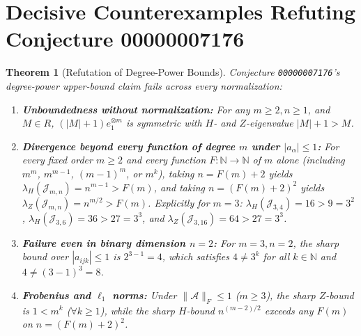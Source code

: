 \documentclass[11pt]{article}
\newtheorem{theorem}{Theorem}[section]
\theoremstyle{definition}
\newcommand{\N}{\mathbb{N}}
\newcommand{\cA}{\mathcal{A}}
\newcommand{\cJ}{\mathcal{J}}
\begin{document}
\section{Decisive Counterexamples Refuting Conjecture 00000007176}

\begin{theorem}[Refutation of Degree-Power Bounds]\label{thm:refute-deg}
Conjecture \texttt{00000007176}'s degree-power upper-bound claim fails across every
normalization:
\begin{enumerate}
  \item \textbf{Unboundedness without normalization:} For any $m \ge 2, n \ge 1$, and $M \in R$,
  $(|M| + 1) e_1^{\otimes m}$ is symmetric with $H$- and $Z$-eigenvalue $|M| + 1 > M$.
  \item \textbf{Divergence beyond every function of degree $m$ under $|a_\alpha| \le 1$:} For
  every fixed order $m \ge 2$ and \emph{every} function $F : \N \to \N$ of $m$ alone (including
  $m^m$, $m^{m-1}$, $(m-1)^m$, or $m^k$), taking $n = F(m) + 2$ yields $\lambda_H(\cJ_{m,n}) =
  n^{m-1} > F(m)$, and taking $n = (F(m) + 2)^2$ yields $\lambda_Z(\cJ_{m,n}) = n^{m/2} > F(m)$.
  Explicitly for $m = 3$: $\lambda_H(\cJ_{3,4}) = 16 > 9 = 3^2$, $\lambda_H(\cJ_{3,6}) = 36 > 27 = 3^3$,
  and $\lambda_Z(\cJ_{3,16}) = 64 > 27 = 3^3$.
  \item \textbf{Failure even in binary dimension $n = 2$:} For $m = 3, n = 2$, the sharp bound
  over $|a_{ijk}| \le 1$ is $2^{3-1} = 4$, which satisfies $4 \ne 3^k$ for all $k \in \N$ and
  $4 \ne (3-1)^3 = 8$.
  \item \textbf{Frobenius and $\ell_1$ norms:} Under $\|\cA\|_F \le 1$ ($m \ge 3$), the sharp
  $Z$-bound is $1 < m^k$ ($\forall k \ge 1$), while the sharp $H$-bound $n^{(m-2)/2}$ exceeds
  any $F(m)$ on $n = (F(m)+2)^2$.
\end{enumerate}
\end{theorem}
\end{document}
